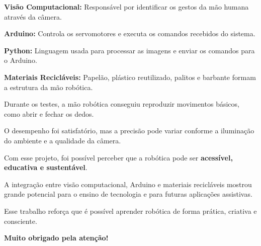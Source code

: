 \documentclass[12pt]{article}
\begin{document}
\begin{tcolorbox}[colback=orange!5,colframe=laranja,title=\textbf{Tecnologias Utilizadas}]
\textbf{Visão Computacional:} Responsável por identificar os gestos da mão humana através da câmera.

\textbf{Arduino:} Controla os servomotores e executa os comandos recebidos do sistema.

\textbf{Python:} Linguagem usada para processar as imagens e enviar os comandos para o Arduino.

\textbf{Materiais Recicláveis:} Papelão, plástico reutilizado, palitos e barbante formam a estrutura da mão robótica.
\end{tcolorbox}

\begin{tcolorbox}[colback=blue!5,colframe=azul,title=\textbf{Resultados}]
Durante os testes, a mão robótica conseguiu reproduzir movimentos básicos, como abrir e fechar os dedos.

O desempenho foi satisfatório, mas a precisão pode variar conforme a iluminação do ambiente e a qualidade da câmera.
\end{tcolorbox}

\begin{tcolorbox}[colback=green!5,colframe=verde,title=\textbf{Conclusão}]
Com esse projeto, foi possível perceber que a robótica pode ser \textbf{acessível, educativa e sustentável}.

A integração entre visão computacional, Arduino e materiais recicláveis mostrou grande potencial para o ensino de tecnologia e para futuras aplicações assistivas.

Esse trabalho reforça que é possível aprender robótica de forma prática, criativa e consciente.

\textbf{Muito obrigado pela atenção!}
\end{tcolorbox}
\end{document}
